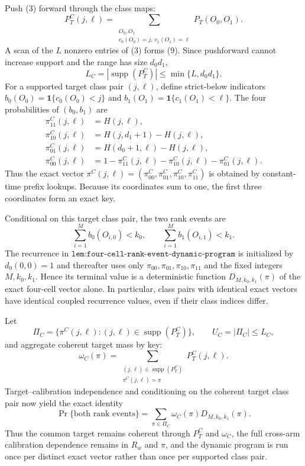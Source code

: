 Push (3) forward through the class maps:
\[
P_T^C(j,\ell)=\sum_{\substack{O_0,O_1\\c_0(O_0)=j,\ c_1(O_1)=\ell}}P_T(O_0,O_1).\tag{9}
\]
A scan of the \(L\) nonzero entries of (3) forms (9). Since pushforward cannot increase support and the range has size \(d_0d_1\),
\[
L_C=|\operatorname{supp}(P_T^C)|\le\min\{L,d_0d_1\}.\tag{10}
\]
For a supported target class pair \((j,\ell)\), define strict-below indicators \(b_0(O_0)=\mathbf 1\{c_0(O_0)<j\}\) and \(b_1(O_1)=\mathbf 1\{c_1(O_1)<\ell\}\). The four probabilities of \((b_0,b_1)\) are
\[
\begin{aligned}
\pi_{11}^C(j,\ell)&=H(j,\ell),\\
\pi_{10}^C(j,\ell)&=H(j,d_1+1)-H(j,\ell),\\
\pi_{01}^C(j,\ell)&=H(d_0+1,\ell)-H(j,\ell),\\
\pi_{00}^C(j,\ell)&=1-\pi_{11}^C(j,\ell)-\pi_{10}^C(j,\ell)-\pi_{01}^C(j,\ell).
\end{aligned}\tag{11}
\]
Thus the exact vector \(\pi^C(j,\ell)=(\pi_{00}^C,\pi_{01}^C,\pi_{10}^C,\pi_{11}^C)\) is obtained by constant-time prefix lookups. Because its coordinates sum to one, the first three coordinates form an exact key.

Conditional on this target class pair, the two rank events are
\[
\sum_{i=1}^M b_0(O_{i,0})<k_0,\qquad \sum_{i=1}^M b_1(O_{i,1})<k_1.\tag{12}
\]
The recurrence in \(\texttt{lem:four-cell-rank-event-dynamic-program}\) is initialized by \(d_0(0,0)=1\) and thereafter uses only \(\pi_{00},\pi_{01},\pi_{10},\pi_{11}\) and the fixed integers \(M,k_0,k_1\). Hence its terminal value is a deterministic function \(D_{M,k_0,k_1}(\pi)\) of the exact four-cell vector alone. In particular, class pairs with identical exact vectors have identical coupled recurrence values, even if their class indices differ.

Let
\[
\Pi_C=\{\pi^C(j,\ell):(j,\ell)\in\operatorname{supp}(P_T^C)\},\qquad U_C=|\Pi_C|\le L_C,\tag{13}
\]
and aggregate coherent target mass by key:
\[
\omega_C(\pi)=\sum_{\substack{(j,\ell)\in\operatorname{supp}(P_T^C)\\\pi^C(j,\ell)=\pi}}P_T^C(j,\ell).\tag{14}
\]
Target--calibration independence and conditioning on the coherent target class pair now yield the exact identity
\[
\Pr\{\text{both rank events}\}=\sum_{\pi\in\Pi_C}\omega_C(\pi)D_{M,k_0,k_1}(\pi).\tag{15}
\]
Thus the common target remains coherent through \(P_T^C\) and \(\omega_C\), the full cross-arm calibration dependence remains in \(R_w\) and \(\pi\), and the dynamic program is run once per distinct exact vector rather than once per supported class pair.

